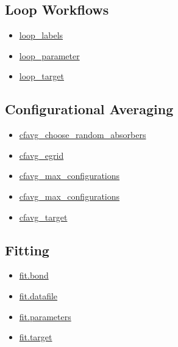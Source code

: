 \documentclass[11pt]{article}
\begin{document}
\subsection*{Loop Workflows}
\begin{itemize}
\item \hyperref[kw:loop-labels]{loop\_labels}
\item \hyperref[kw:loop-parameter]{loop\_parameter}
\item \hyperref[kw:loop-target]{loop\_target}
\end{itemize}

\subsection*{Configurational Averaging}
\begin{itemize}
\item \hyperref[kw:cfavg-choose-random-absorbers]{cfavg\_choose\_random\_absorbers}
\item \hyperref[kw:cfavg-egrid]{cfavg\_egrid}
\item \hyperref[kw:cfavg-max-configurations]{cfavg\_max\_configurations}
\item \hyperref[kw:cfavg-max-configurations]{cfavg\_max\_configurations}
\item \hyperref[kw:cfavg-target]{cfavg\_target}
\end{itemize}

\subsection*{Fitting}
\begin{itemize}
\item \hyperref[kw:fit-bond]{fit.bond}
\item \hyperref[kw:fit-datafile]{fit.datafile}
\item \hyperref[kw:fit-parameters]{fit.parameters}
\item \hyperref[kw:fit-target]{fit.target}
\end{itemize}
\end{document}

